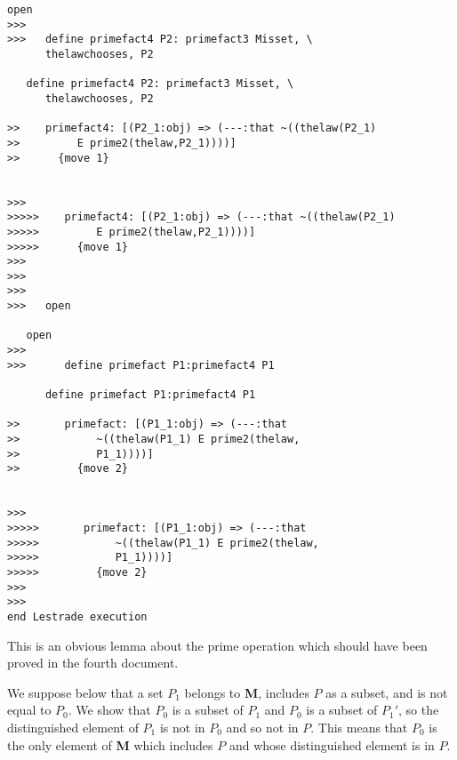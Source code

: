 \documentclass[12pt]{article}
\begin{document}
\begin{verbatim}
open
>>>
>>>   define primefact4 P2: primefact3 Misset, \
      thelawchooses, P2

   define primefact4 P2: primefact3 Misset, \
      thelawchooses, P2

>>    primefact4: [(P2_1:obj) => (---:that ~((thelaw(P2_1)
>>         E prime2(thelaw,P2_1))))]
>>      {move 1}


>>>
>>>>>    primefact4: [(P2_1:obj) => (---:that ~((thelaw(P2_1)
>>>>>         E prime2(thelaw,P2_1))))]
>>>>>      {move 1}
>>>
>>>
>>>
>>>   open

   open
>>>
>>>      define primefact P1:primefact4 P1

      define primefact P1:primefact4 P1

>>       primefact: [(P1_1:obj) => (---:that
>>            ~((thelaw(P1_1) E prime2(thelaw,
>>            P1_1))))]
>>         {move 2}


>>>
>>>>>       primefact: [(P1_1:obj) => (---:that
>>>>>            ~((thelaw(P1_1) E prime2(thelaw,
>>>>>            P1_1))))]
>>>>>         {move 2}
>>>
>>>
end Lestrade execution
\end{verbatim}

This is an obvious lemma about the prime operation which should have been proved in the fourth document.  

We suppose below that a set $P_1$ belongs to {\bf M}, includes $P$ as a subset, and is not equal to $P_0$.  We show that $P_0$ is a subset of $P_1$
and $P_0$ is a subset of $P_1'$, so the distinguished element of $P_1$ is not in $P_0$ and so not in $P$.  This means that $P_0$ is the only element of {\bf M} which includes $P$ and whose distinguished element is in $P$.
\end{document}
